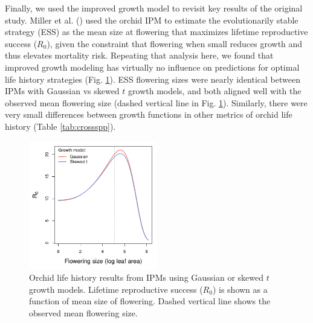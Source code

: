 \documentclass[12pt]{article}
\newcommand{\tom}[2]{{\color{red}{#1}}\footnote{\textit{\color{red}{#2}}}}
\begin{document}
\begin{spacing}{1.9}
Finally, we used the improved growth model to revisit key results of the original study. 
Miller et al. (\citeyear{miller2012evolutionary}) used the orchid IPM to estimate the evolutionarily stable strategy (ESS) as the mean size at flowering that maximizes lifetime reproductive success ($R_0$), given the constraint that flowering when small reduces growth and thus elevates mortality risk. 
Repeating that analysis here, we found that improved growth modeling has virtually no influence on predictions for optimal life history strategies (Fig. \ref{fig:orchid_ESS}). 
ESS flowering sizes were nearly identical between IPMs with Gaussian vs skewed $t$ growth models, and both aligned well with the observed mean flowering size (dashed vertical line in Fig. \ref{fig:orchid_ESS}). 
Similarly, there were very small differences between growth functions in other metrics of orchid life history (Table \ref{tab:crossspp}).

\begin{figure}[tbp]
	\centering
	\includegraphics[width=0.5\textwidth]{figures/orchid_R0.pdf}
	\caption{Orchid life history results from IPMs using Gaussian or skewed $t$ growth models. Lifetime reproductive success ($R_0$) is shown as a function of mean size of flowering. Dashed vertical line shows the observed mean flowering size.}
	\label{fig:orchid_ESS}
\end{figure} 



\end{spacing}
\end{document}
